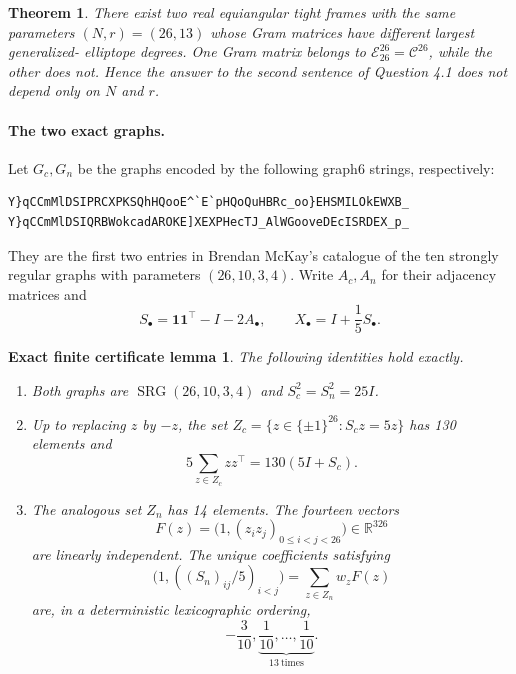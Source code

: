 \documentclass[11pt]{article}
\newtheorem*{theorem}{Theorem}
\newtheorem*{lemma}{Exact finite certificate lemma}
\newcommand{\E}{\mathscr E}
\newcommand{\C}{\mathscr C}
\newcommand{\one}{\mathbf 1}
\newcommand{\R}{\mathbb R}
\begin{document}
\begin{theorem}
There exist two real equiangular tight frames with the same parameters
$(N,r)=(26,13)$ whose Gram matrices have different largest generalized-
elliptope degrees.  One Gram matrix belongs to $\E_{26}^{26}=\C^{26}$, while
the other does not.  Hence the answer to the second sentence of Question 4.1
does not depend only on $N$ and $r$.
\end{theorem}

\paragraph{The two exact graphs.}
Let $G_c,G_n$ be the graphs encoded by the following graph6 strings,
respectively:
\begin{verbatim}
Y}qCCmMlDSIPRCXPKSQhHQooE^`E`pHQoQuHBRc_oo}EHSMILOkEWXB_
Y}qCCmMlDSIQRBWokcadAROKE]XEXPHecTJ_AlWGooveDEcISRDEX_p_
\end{verbatim}
They are the first two entries in Brendan McKay's catalogue of the ten
strongly regular graphs with parameters $(26,10,3,4)$.  Write $A_c,A_n$ for
their adjacency matrices and
\[
 S_\bullet=\one\one^\top-I-2A_\bullet,
 \qquad X_\bullet=I+\frac15S_\bullet.                            \tag{2}
\]

\begin{lemma}
The following identities hold exactly.
\begin{enumerate}
\item Both graphs are $\operatorname{SRG}(26,10,3,4)$ and
      $S_c^2=S_n^2=25I$.
\item Up to replacing $z$ by $-z$, the set
      $Z_c=\{z\in\{\pm1\}^{26}:S_cz=5z\}$ has 130 elements and
      \[
        5\sum_{z\in Z_c}zz^\top=130(5I+S_c).                    \tag{3}
      \]
\item The analogous set $Z_n$ has 14 elements.  The fourteen vectors
      \[
       F(z)=\bigl(1,(z_i z_j)_{0\le i<j<26}\bigr)\in\R^{326}
      \]
      are linearly independent.  The unique coefficients satisfying
      \[
       \bigl(1,((S_n)_{ij}/5)_{i<j}\bigr)
       =\sum_{z\in Z_n}w_zF(z)                                  \tag{4}
      \]
      are, in a deterministic lexicographic ordering,
      \[
        -\frac3{10},\underbrace{\frac1{10},\ldots,\frac1{10}}_{13\ \mathrm{times}}.
                                                                    \tag{5}
      \]
\end{enumerate}
\end{lemma}
\end{document}
